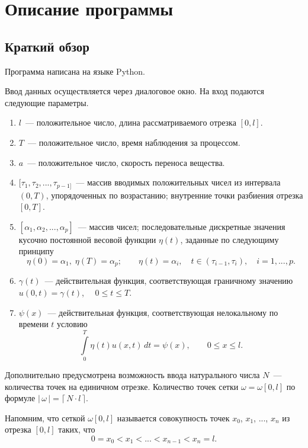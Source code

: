 \documentclass{article}
\renewcommand{\le}{\leqslant}
\theoremstyle{definition}
\begin{document}
\newpage

\section{Описание программы}

\subsection{Краткий обзор}
Программа написана на языке Python.

Ввод данных осуществляется через диалоговое окно. На вход подаются следующие параметры.
\begin{enumerate}
	\item $l$~--- положительное число, длина рассматриваемого отрезка $[0,l]$.
	\item $T$~--- положительное число, время наблюдения за процессом.
	\item $a$~--- положительное число, скорость переноса вещества.
	\item $[\tau_1, \tau_2, ..., \tau_{p - 1]}$~--- массив вводимых положительных чисел из интервала $(0,T)$, упорядоченных по возрастанию; 
	внутренние точки разбиения отрезка $[0,T]$.
	\item $[\alpha_1, \alpha_2, ..., \alpha_p]$~--- массив чисел; последовательные дискретные
	значения кусочно постоянной весовой функции $\eta(t)$, заданные по следующиму принципу
	\begin{equation*}
		\eta(0) = \alpha_1, \; \eta(T) = \alpha_p; \qquad \eta(t) = \alpha_i, \quad t \in (\tau_{i - 1}, \tau_i), \quad i = 1, ..., p.
	\end{equation*}  
	\item $\gamma(t)$~--- действительная функция, соответствующая граничному значению $u(0,t) = \gamma(t)$, $ \quad 0 \le t \le T$.
	\item $\psi(x)$~--- действительная функция, соответствующая нелокальному по времени $t$ условию
	\begin{equation*}
		\int\limits_{0}^{T} \eta(t) u(x, t)\,dt = \psi(x), 	\qquad 0 \le x \le l.
	\end{equation*}
\end{enumerate}
Дополнительно предусмотрена возможность ввода натурального числа $N$~--- количества точек на единичном отрезке. 
Количество точек сетки $\omega = \omega[0,l]$ по формуле $|\, \omega \,| = \lceil\, N \!\cdot\! l \,\rceil$.

Напомним, что сеткой $\omega[0,l]$ называется совокупность точек $x_0$, $x_1$, ..., $x_n$ из отрезка $[0,l]$ таких, что
\begin{equation*}
	0 = x_0 < x_1 < ... < x_{n - 1} < x_n = l.
\end{equation*}
\end{document}
